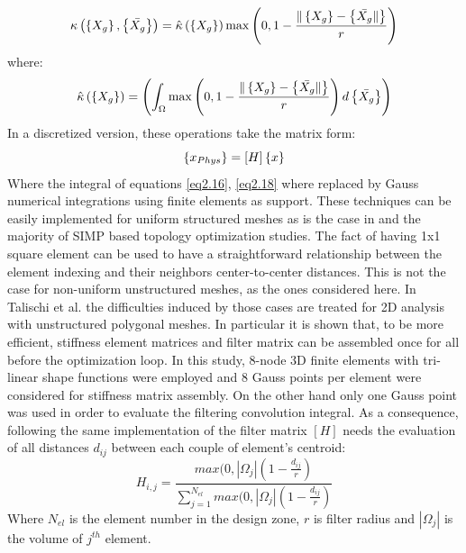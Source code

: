  \begin{equation}
 \kappa\left(\left\lbrace{X_g}\right \rbrace,\left\lbrace{\bar{X_g}}\right \rbrace\right)=\hat{\kappa}\left(\left\lbrace{X_g}\right \rbrace\right) \max\left(0,1-\frac{\|\left\lbrace{X_g}\right \rbrace-\left\lbrace{\bar{X_g} \|}\right \rbrace}{r} \right)
 \end{equation}
 where:
 \begin{equation}
 \label{eq2.18}
\hat{\kappa}\left(\left\lbrace{X_g}\right \rbrace\right)=\left( \int_{\Omega}{\max\left(0,1-\frac{\|\left\lbrace{X_g}\right \rbrace-\left\lbrace{\bar{X_g} \|}\right \rbrace}{r} \right)d\left\lbrace{\bar{X_g}}\right \rbrace} \right)
 \end{equation}
 In a discretized version, these operations take the matrix form:
 \begin{equation}
 \left\lbrace{x_{Phys}}\right \rbrace=\left[{H}\right]\left\lbrace{x}\right \rbrace
 \end{equation}
 Where the integral of equations \eqref{eq2.16}, \eqref{eq2.18} where replaced by Gauss numerical integrations using finite elements as support. 
 These techniques can be easily implemented for uniform structured meshes as is the case in \cite{andreassen2011efficient} and the majority of SIMP based topology optimization studies. 
 The fact of having 1x1 square element can be used to have a straightforward relationship between the element indexing and their neighbors center-to-center distances.  This is not the case for non-uniform unstructured meshes, as the ones considered here. In Talischi et al. \cite{talischi2012polytop} the difficulties induced by those cases are treated for 2D analysis with unstructured polygonal meshes. In particular it is shown that, to be more efficient, stiffness element matrices and  filter matrix can be assembled once for all before the optimization loop. In this study, 8-node 3D finite elements with tri-linear shape functions were employed and 8 Gauss points per element were considered for stiffness matrix assembly. On the other hand only one Gauss point was used in order to evaluate the filtering convolution integral. As a consequence, following the same implementation of \cite{talischi2012polytop} the filter matrix $\left[H\right]$ needs the evaluation of all distances $d_{ij}$ between each couple of element's centroid:
 \begin{equation}
 \label{e.11}
 H_{i,j} = \frac{max(0,| \Omega_j| (1-\frac{d_{ij}}{r})}{\sum_{j=1}^{N_{el}}max(0,| \Omega_j| (1-\frac{d_{ij}}{r})}
 \end{equation}
 Where $N_{el}$ is the element number in the design zone, $r$ is filter radius and $| \Omega_j|$ is the volume of $j^{th}$ element.
